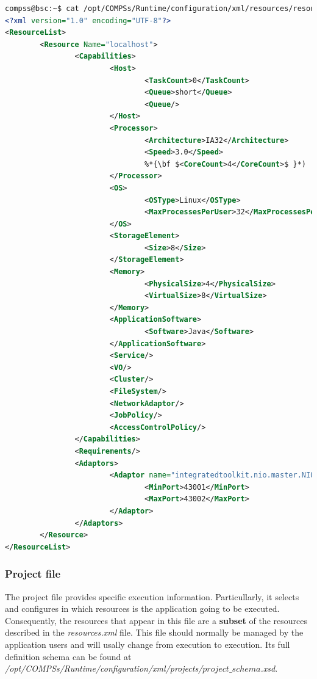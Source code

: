 \begin{lstlisting}[language=xml]
compss@bsc:~$ cat /opt/COMPSs/Runtime/configuration/xml/resources/resources.xml
<?xml version="1.0" encoding="UTF-8"?>
<ResourceList>
        <Resource Name="localhost">
                <Capabilities>
                        <Host>
                                <TaskCount>0</TaskCount>
                                <Queue>short</Queue>
                                <Queue/>
                        </Host>
                        <Processor>
                                <Architecture>IA32</Architecture>
                                <Speed>3.0</Speed>
                                %*{\bf $<CoreCount>4</CoreCount>$ }*)
                        </Processor>
                        <OS>
                                <OSType>Linux</OSType>
                                <MaxProcessesPerUser>32</MaxProcessesPerUser>
                        </OS>
                        <StorageElement>
                                <Size>8</Size>
                        </StorageElement>
                        <Memory>
                                <PhysicalSize>4</PhysicalSize>
                                <VirtualSize>8</VirtualSize>
                        </Memory>
                        <ApplicationSoftware>
                                <Software>Java</Software>
                        </ApplicationSoftware>
                        <Service/>
                        <VO/>
                        <Cluster/>
                        <FileSystem/>
                        <NetworkAdaptor/>
                        <JobPolicy/>
                        <AccessControlPolicy/>
                </Capabilities>
                <Requirements/>
                <Adaptors>
                        <Adaptor name="integratedtoolkit.nio.master.NIOAdaptor">
                                <MinPort>43001</MinPort>
                                <MaxPort>43002</MaxPort>
                        </Adaptor>
                </Adaptors>
        </Resource>
</ResourceList>
\end{lstlisting}


\subsubsection{Project file}
The project file provides specific execution information. Particullarly, it selects and configures in which resources
is the application going to be executed. Consequently, the resources that appear in this file are a \textbf{subset} of the 
resources described in the \textit{resources.xml} file. This file should normally be managed by the application users and will
usally change from execution to execution. Its full definition schema can be found at 
\emph{/opt/COMPSs/Runtime/configuration/xml/projects/$project\_schema$.xsd}.

